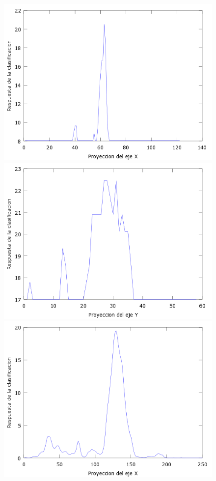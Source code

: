 \begin{figure}[htc]
  \centering
  \includegraphics[scale=.4]{images/plots/boost7X}
  \includegraphics[scale=.4]{images/plots/boost7Y}
  \includegraphics[scale=.4]{images/plots/svm7X}

\end{figure}
